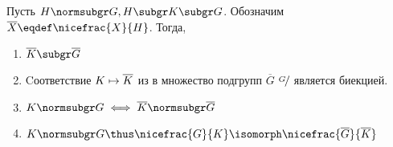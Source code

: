 {
\renewcommand*{\factorgr}[2]{%
  \ifstrempty{#2}%
  {\ensuremath{\overline{#1}}}%
  {\ensuremath{\nicefrac{#1}{#2}}}}
\newcommand{\ffgr}[2]{\factorgr{\factorgr{#1}{}}{\factorgr{#2}{}}}
\begin{theorem}
  Пусть $H\normsubgr G, H\subgr K\subgr G$. Обозначим $\factorgr{X}{}\eqdef \factorgr{X}{H}$. Тогда,
  \begin{enumerate}
    \item $\factorgr{K}{}\subgr \factorgr{G}{}$
    \item Cоответствие $K\mapsto \factorgr{K}{}$ из  в множество подгрупп \factorgr{G}{} является биекцией.
    \item $K\normsubgr G \iff \factorgr{K}{}\normsubgr\factorgr{G}{}$
    \item $K\normsubgr G \thus \factorgr{G}{K}\isomorph\ffgr{G}{K}$
  \end{enumerate}
\end{theorem}

}
